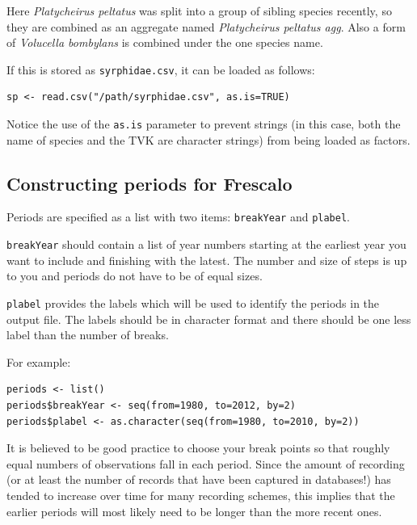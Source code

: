 \documentclass{article}
\begin{document}
Here \emph{Platycheirus peltatus} was split into a group of sibling species 
recently, so they are combined as an aggregate named \emph{Platycheirus 
peltatus agg}. Also a form of \emph{Volucella bombylans} is combined under 
the one species name.

If this is stored as \texttt{syrphidae.csv}, it can be loaded as follows:
\begin{verbatim}
sp <- read.csv("/path/syrphidae.csv", as.is=TRUE)
\end{verbatim}

Notice the use of the \texttt{as.is} parameter to prevent strings (in this case,
both the name of species and the TVK are character strings) from being loaded as
factors. 

\subsection{Constructing periods for Frescalo}
Periods are specified as a list with two
items: \texttt{breakYear} and \texttt{plabel}. 

\texttt{breakYear} should contain a
list of year numbers starting at the earliest year you want to include and
finishing with the latest. The number and size of steps is up to you and
periods do not have to be of equal sizes. 

\texttt{plabel} provides the labels
which will be used to identify the periods in the output file. The labels
should be in character format and there should be one less label than the
number of breaks.
 
For example:
\begin{verbatim}
periods <- list()
periods$breakYear <- seq(from=1980, to=2012, by=2)
periods$plabel <- as.character(seq(from=1980, to=2010, by=2))
\end{verbatim}
 
It is believed to be good practice to choose your break points so that
roughly equal numbers of observations fall in each period. Since the amount
of recording (or at least the number of records that have been captured in
databases!) has tended to increase over time for many recording schemes, this
implies that the earlier periods will most likely need to be longer than the
more recent ones.
\end{document}
